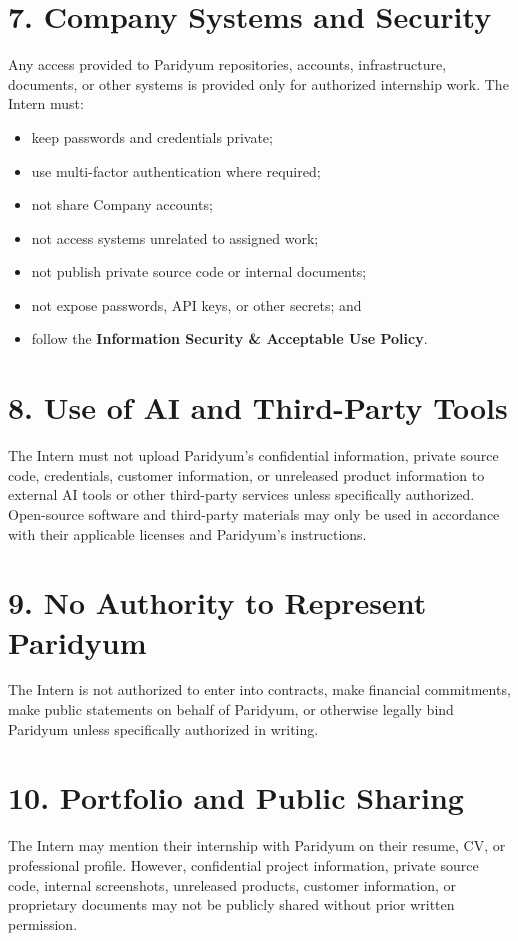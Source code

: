 \documentclass{paridyum}
\begin{document}
\section*{7. Company Systems and Security}
Any access provided to Paridyum repositories, accounts, infrastructure, documents, or
other systems is provided only for authorized internship work. The Intern must:
\begin{itemize}[leftmargin=*, noitemsep]
    \item keep passwords and credentials private;
    \item use multi-factor authentication where required;
    \item not share Company accounts;
    \item not access systems unrelated to assigned work;
    \item not publish private source code or internal documents;
    \item not expose passwords, API keys, or other secrets; and
    \item follow the \textbf{Information Security \& Acceptable Use Policy}.
\end{itemize}

\section*{8. Use of AI and Third-Party Tools}
The Intern must not upload Paridyum's confidential information, private source code,
credentials, customer information, or unreleased product information to external AI
tools or other third-party services unless specifically authorized. Open-source
software and third-party materials may only be used in accordance with their
applicable licenses and Paridyum's instructions.

\section*{9. No Authority to Represent Paridyum}
The Intern is not authorized to enter into contracts, make financial commitments, make
public statements on behalf of Paridyum, or otherwise legally bind Paridyum unless
specifically authorized in writing.

\section*{10. Portfolio and Public Sharing}
The Intern may mention their internship with Paridyum on their resume, CV, or
professional profile. However, confidential project information, private source code,
internal screenshots, unreleased products, customer information, or proprietary
documents may not be publicly shared without prior written permission.
\end{document}
